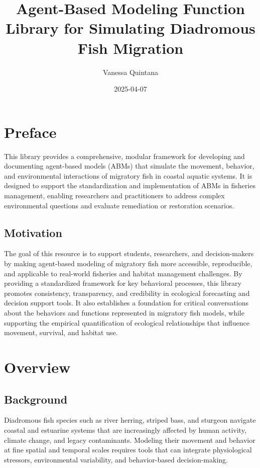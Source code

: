 \documentclass[
]{book}
\title{Agent-Based Modeling Function Library for Simulating Diadromous Fish Migration}
\author{Vanessa Quintana}
\date{2025-04-07}
\begin{document}
\maketitle

{
\setcounter{tocdepth}{1}
\tableofcontents
}
\chapter*{Preface}\label{preface}

This library provides a comprehensive, modular framework for developing and documenting agent-based models (ABMs) that simulate the movement, behavior, and environmental interactions of migratory fish in coastal aquatic systems. It is designed to support the standardization and implementation of ABMs in fisheries management, enabling researchers and practitioners to address complex environmental questions and evaluate remediation or restoration scenarios.

\section*{Motivation}\label{motivation}

The goal of this resource is to support students, researchers, and decision-makers by making agent-based modeling of migratory fish more accessible, reproducible, and applicable to real-world fisheries and habitat management challenges. By providing a standardized framework for key behavioral processes, this library promotes consistency, transparency, and credibility in ecological forecasting and decision support tools. It also establishes a foundation for critical conversations about the behaviors and functions represented in migratory fish models, while supporting the empirical quantification of ecological relationships that influence movement, survival, and habitat use.

\chapter{Overview}\label{overview}

\section{Background}\label{background}

Diadromous fish species such as river herring, striped bass, and sturgeon navigate coastal and estuarine systems that are increasingly affected by human activity, climate change, and legacy contaminants. Modeling their movement and behavior at fine spatial and temporal scales requires tools that can integrate physiological stressors, environmental variability, and behavior-based decision-making.
\end{document}

